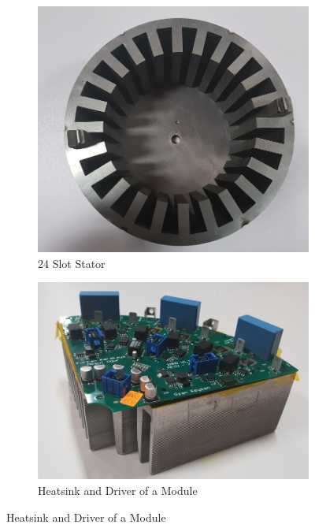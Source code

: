 \documentclass[a4paper,11pt]{article}
\begin{document}
\begin{figure}[ht!]
\begin{subfigure}[b]{0.33\textwidth}
    \centering
    \includegraphics[width=\linewidth]{stator.png}
    \caption{24 Slot Stator}
    \label{fig:4phmmf}    
\end{subfigure}
\begin{subfigure}[b]{0.33\textwidth}
    \centering
    \includegraphics[width=\linewidth]{heatsink.png}
    \caption{Heatsink and Driver of a Module}
    \label{fig:s6phmmf}    
\end{subfigure}

\end{figure}
\end{document}
